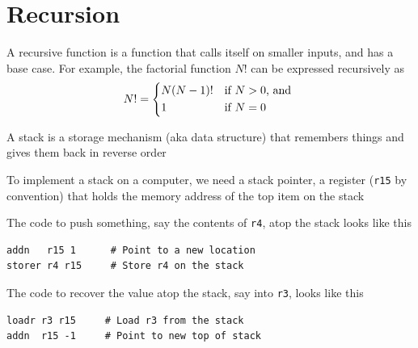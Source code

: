 \documentclass[8pt,a4paper,compress]{beamer}
\begin{document}
\section{Recursion}

\begin{frame}[fragile]
\pause

A recursive function is a function that calls itself on smaller inputs, and has a base case. For example, the factorial function $N!$ can be expressed recursively as 
\[
N! = \begin{dcases*}
N(N-1)! & if $N > 0$, and \\
1       & if $N=0$
\end{dcases*}
\]

\pause
\bigskip

A stack is a storage mechanism (aka data structure) that remembers things and gives them back in reverse order

\pause
\bigskip

To implement a stack on a computer, we need a stack pointer, a register (\lstinline{r15} by convention) that holds the memory address of the top item on the stack

\pause
\bigskip

The code to push something, say the contents of \lstinline{r4}, atop the stack looks like this
\begin{lstlisting}[language={}]
addn   r15 1      # Point to a new location
storer r4 r15     # Store r4 on the stack
\end{lstlisting}

\pause
\bigskip

The code to recover the value atop the stack, say into \lstinline{r3}, looks like this
\begin{lstlisting}[language={}]
loadr r3 r15     # Load r3 from the stack
addn  r15 -1     # Point to new top of stack
\end{lstlisting}
\end{frame}
\end{document}
